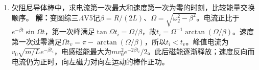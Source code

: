 \documentclass[UTF8,fontset=fandol,a4paper,11pt]{ctexart}
\begin{document}
\begin{enumerate}
\item 欠阻尼导体棒中，求电流第一次最大和速度第一次为零的时刻，比较能量交换顺序。
\textbf{解：}变图综三.4V5记$\beta=R/(2L)$、$\Omega=\sqrt{\omega_2^2-\beta^2}$。电流正比于$e^{-\beta t}\sin\Omega t$，第一次峰满足$\tan\Omega t_i=\Omega/\beta$，故$t_i=\Omega^{-1}\arctan(\Omega/\beta)$。速度第一次过零满足$\Omega t_v=\pi-\arctan(\Omega/\beta)$，所以$t_i<t_v$。峰值电流为$v_0\sqrt{m/L}e^{-\beta t_i}$，电感磁能最大为$mv_0^2e^{-2\beta t_i}/2$。此后磁能逐渐释放；速度反向而电流仍为正时，向左磁力对向左运动的棒作正功。
\begin{center}\begin{minipage}{.98\linewidth}\centering
{}
\end{minipage}
\end{center}
\end{enumerate}
\end{document}
